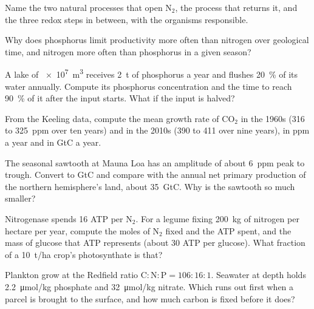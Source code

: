 \begin{exercise}[$\star$]\label{exo:b2:biogeochemical-cycles:3}
Name the two natural processes that open $\mathrm{N_2}$, the process that
returns it, and the three redox steps in between, with the
organisms responsible.
\end{exercise}

\begin{exercise}[$\star$]\label{exo:b2:biogeochemical-cycles:4}
Why does phosphorus limit productivity more often than nitrogen
over geological time, and nitrogen more often than phosphorus in a
given season?
\end{exercise}

\begin{exercise}[$\star\star$]\label{exo:b2:biogeochemical-cycles:5}
A lake of \qty{e7}{m^3} receives \qty{2}{t} of phosphorus a year
and flushes \qty{20}{\%} of its water annually. Compute its  phosphorus concentration and the time to reach \qty{90}{\%}
of it after the input starts. What if the input is halved?
\end{exercise}

\begin{exercise}[$\star\star$]\label{exo:b2:biogeochemical-cycles:6}
From the Keeling data, compute the mean growth rate of $\mathrm{CO_2}$ in
the 1960s (316 to \qty{325}{ppm} over ten years) and in the 2010s
(390 to 411 over nine years), in ppm a year and in GtC a year.
\end{exercise}

\begin{exercise}[$\star\star$]\label{exo:b2:biogeochemical-cycles:7}
The seasonal sawtooth at Mauna Loa has an amplitude of about
\qty{6}{ppm} peak to trough. Convert to GtC and compare with the
annual net primary production of the northern hemisphere's land,
about \qty{35}{GtC}. Why is the sawtooth so much smaller?
\end{exercise}

\begin{exercise}[$\star\star$]\label{exo:b2:biogeochemical-cycles:8}
Nitrogenase spends 16 ATP per $\mathrm{N_2}$. For a legume fixing
\qty{200}{kg} of nitrogen per hectare per year, compute the moles of
$\mathrm{N_2}$ fixed and the ATP spent, and the mass of glucose that ATP
represents (about 30 ATP per glucose). What fraction of a
\qty{10}{t/ha} crop's photosynthate is that?
\end{exercise}

\begin{exercise}[$\star\star$]\label{exo:b2:biogeochemical-cycles:9}
Plankton grow at the Redfield ratio $\mathrm{C:N:P} = 106:16:1$.
Seawater at depth holds \qty{2.2}{\micro mol/kg} phosphate and
\qty{32}{\micro mol/kg} nitrate. Which runs out first when a parcel
is brought to the surface, and how much carbon is fixed before it
does?
\end{exercise}

